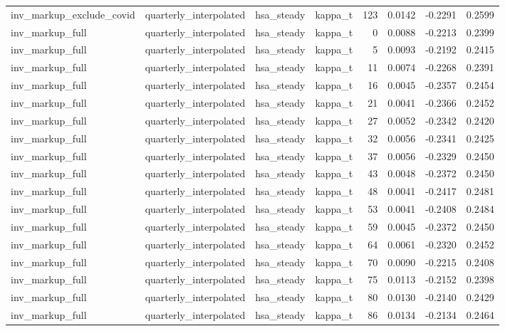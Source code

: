 \begin{tabular}{llllrrrr}
inv\_markup\_exclude\_covid & quarterly\_interpolated & hsa\_steady & kappa\_t & 123 & 0.0142 & -0.2291 & 0.2599 \\
inv\_markup\_full & quarterly\_interpolated & hsa\_steady & kappa\_t & 0 & 0.0088 & -0.2213 & 0.2399 \\
inv\_markup\_full & quarterly\_interpolated & hsa\_steady & kappa\_t & 5 & 0.0093 & -0.2192 & 0.2415 \\
inv\_markup\_full & quarterly\_interpolated & hsa\_steady & kappa\_t & 11 & 0.0074 & -0.2268 & 0.2391 \\
inv\_markup\_full & quarterly\_interpolated & hsa\_steady & kappa\_t & 16 & 0.0045 & -0.2357 & 0.2454 \\
inv\_markup\_full & quarterly\_interpolated & hsa\_steady & kappa\_t & 21 & 0.0041 & -0.2366 & 0.2452 \\
inv\_markup\_full & quarterly\_interpolated & hsa\_steady & kappa\_t & 27 & 0.0052 & -0.2342 & 0.2420 \\
inv\_markup\_full & quarterly\_interpolated & hsa\_steady & kappa\_t & 32 & 0.0056 & -0.2341 & 0.2425 \\
inv\_markup\_full & quarterly\_interpolated & hsa\_steady & kappa\_t & 37 & 0.0056 & -0.2329 & 0.2450 \\
inv\_markup\_full & quarterly\_interpolated & hsa\_steady & kappa\_t & 43 & 0.0048 & -0.2372 & 0.2450 \\
inv\_markup\_full & quarterly\_interpolated & hsa\_steady & kappa\_t & 48 & 0.0041 & -0.2417 & 0.2481 \\
inv\_markup\_full & quarterly\_interpolated & hsa\_steady & kappa\_t & 53 & 0.0041 & -0.2408 & 0.2484 \\
inv\_markup\_full & quarterly\_interpolated & hsa\_steady & kappa\_t & 59 & 0.0045 & -0.2372 & 0.2450 \\
inv\_markup\_full & quarterly\_interpolated & hsa\_steady & kappa\_t & 64 & 0.0061 & -0.2320 & 0.2452 \\
inv\_markup\_full & quarterly\_interpolated & hsa\_steady & kappa\_t & 70 & 0.0090 & -0.2215 & 0.2408 \\
inv\_markup\_full & quarterly\_interpolated & hsa\_steady & kappa\_t & 75 & 0.0113 & -0.2152 & 0.2398 \\
inv\_markup\_full & quarterly\_interpolated & hsa\_steady & kappa\_t & 80 & 0.0130 & -0.2140 & 0.2429 \\
inv\_markup\_full & quarterly\_interpolated & hsa\_steady & kappa\_t & 86 & 0.0134 & -0.2134 & 0.2464 \\

\end{tabular}

